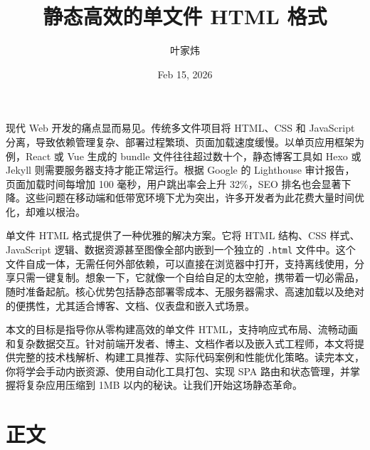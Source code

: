 \title{静态高效的单文件 HTML 格式}
\author{叶家炜}
\date{Feb 15, 2026}
\maketitle
现代 Web 开发的痛点显而易见。传统多文件项目将 HTML、CSS 和 JavaScript 分离，导致依赖管理复杂、部署过程繁琐、页面加载速度缓慢。以单页应用框架为例，React 或 Vue 生成的 bundle 文件往往超过数十个，静态博客工具如 Hexo 或 Jekyll 则需要服务器支持才能正常运行。根据 Google 的 Lighthouse 审计报告，页面加载时间每增加 100 毫秒，用户跳出率会上升 32\%{}，SEO 排名也会显著下降。这些问题在移动端和低带宽环境下尤为突出，许多开发者为此花费大量时间优化，却难以根治。\par
单文件 HTML 格式提供了一种优雅的解决方案。它将 HTML 结构、CSS 样式、JavaScript 逻辑、数据资源甚至图像全部内嵌到一个独立的 \texttt{.html} 文件中。这个文件自成一体，无需任何外部依赖，可以直接在浏览器中打开，支持离线使用，分享只需一键复制。想象一下，它就像一个自给自足的太空舱，携带着一切必需品，随时准备起航。核心优势包括静态部署零成本、无服务器需求、高速加载以及绝对的便携性，尤其适合博客、文档、仪表盘和嵌入式场景。\par
本文的目标是指导你从零构建高效的单文件 HTML，支持响应式布局、流畅动画和复杂数据交互。针对前端开发者、博主、文档作者以及嵌入式工程师，本文将提供完整的技术栈解析、构建工具推荐、实际代码案例和性能优化策略。读完本文，你将学会手动内嵌资源、使用自动化工具打包、实现 SPA 路由和状态管理，并掌握将复杂应用压缩到 1MB 以内的秘诀。让我们开始这场静态革命。\par
\chapter{正文}
